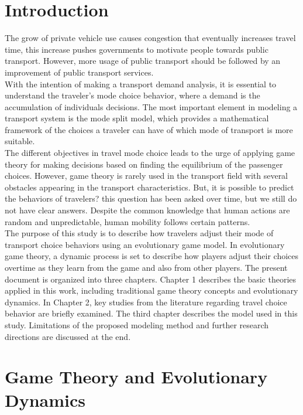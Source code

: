 \documentclass[12pt]{report}
\begin{document}
\thispagestyle{empty}
\thispagestyle{empty}
\chapter*{Introduction}
The grow of private vehicle use causes congestion that eventually  increases travel time, this increase pushes governments to motivate people towards public transport. However, more usage of public transport should be followed by an improvement of public transport services.\\

With the intention of making a transport demand analysis, it is essential to understand the traveler's mode choice behavior, where a demand is the accumulation of individuals decisions. The most important element in modeling a transport system is the mode split model, which provides a mathematical framework of the choices a traveler can have of which mode of transport is more suitable.\\

The different objectives in travel mode choice leads to the urge of applying game theory for making decisions based on finding the equilibrium of the passenger choices. However, game theory is rarely used in the transport field with several obstacles appearing in the transport characteristics. But, it is possible to predict the behaviors of travelers? this question has been asked over time, but we still do not have clear answers. Despite the common knowledge that human actions are random and unpredictable, human mobility follows certain patterns.\\

The purpose of this study is to describe how travelers adjust their mode of transport choice behaviors using an evolutionary game model. In evolutionary game theory, a dynamic process is set to describe how players adjust their choices overtime as they learn from the game and also from other players. The present document is organized into three chapters. Chapter 1 describes the basic theories applied in this work, including traditional game theory concepts and evolutionary dynamics. In Chapter 2, key studies from the literature regarding travel choice behavior are briefly examined. The third chapter describes the model used in this study. Limitations of the proposed modeling method and further research directions are discussed at the end. 


\chapter{Game Theory and Evolutionary Dynamics}\setcounter{page}{1}\thispagestyle{empty}

\end{document}
